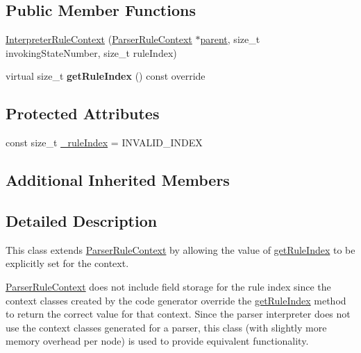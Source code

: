 \subsection*{Public Member Functions}
\begin{DoxyCompactItemize}
\item 
\hyperlink{classantlr4_1_1InterpreterRuleContext_a5a949bd664dc61aeae247b331b0a2985}{Interpreter\+Rule\+Context} (\hyperlink{classantlr4_1_1ParserRuleContext}{Parser\+Rule\+Context} $\ast$\hyperlink{classantlr4_1_1tree_1_1ParseTree_a83402632670316b68280c04e6be70d50}{parent}, size\+\_\+t invoking\+State\+Number, size\+\_\+t rule\+Index)
\item 
\mbox{\label{classantlr4_1_1InterpreterRuleContext_a5816053028450822fadce8c74b70bbe7}} 
virtual size\+\_\+t {\bfseries get\+Rule\+Index} () const override
\end{DoxyCompactItemize}
\subsection*{Protected Attributes}
\begin{DoxyCompactItemize}
\item 
const size\+\_\+t \hyperlink{classantlr4_1_1InterpreterRuleContext_a6837c7ee2d10282cb7dd84f2cac19018}{\+\_\+rule\+Index} = I\+N\+V\+A\+L\+I\+D\+\_\+\+I\+N\+D\+EX
\end{DoxyCompactItemize}
\subsection*{Additional Inherited Members}


\subsection{Detailed Description}
This class extends \hyperlink{classantlr4_1_1ParserRuleContext}{Parser\+Rule\+Context} by allowing the value of \hyperlink{}{get\+Rule\+Index} to be explicitly set for the context.

\hyperlink{classantlr4_1_1ParserRuleContext}{Parser\+Rule\+Context} does not include field storage for the rule index since the context classes created by the code generator override the \hyperlink{}{get\+Rule\+Index} method to return the correct value for that context. Since the parser interpreter does not use the context classes generated for a parser, this class (with slightly more memory overhead per node) is used to provide equivalent functionality.

